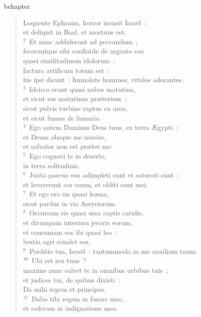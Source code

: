 bchapter\begin{verse}\vspace{-19pt}Loquente Ephraim, horror invasit Isra\"el~;\\ et deliquit in Baal, et mortuus est.\\
${}^{2}$~Et nunc addiderunt ad peccandum~;\\ feceruntque sibi conflatile de argento suo\\ quasi similitudinem idolorum~:\\ factura artificum totum est~:\\ his ipsi dicunt~: Immolate homines, vitulos adorantes.\\
${}^{3}$~Idcirco erunt quasi nubes matutina,\\ et sicut ros matutinus pr\ae teriens~;\\ sicut pulvis turbine raptus ex area,\\ et sicut fumus de fumario.\\
${}^{4}$~Ego autem Dominus Deus tuus, ex terra \AE gypti~;\\ et Deum absque me nescies,\\ et salvator non est pr\ae ter me.\\
${}^{5}$~Ego cognovi te in deserto,\\ in terra solitudinis.\\
${}^{6}$~Juxta pascua sua adimpleti sunt et saturati sunt~;\\ et levaverunt cor suum, et obliti sunt mei.\\
${}^{7}$~Et ego ero eis quasi le\ae na,\\ sicut pardus in via Assyriorum.\\
${}^{8}$~Occurram eis quasi ursa raptis catulis,\\ et dirumpam interiora jecoris eorum,\\ et consumam eos ibi quasi leo~:\\ bestia agri scindet eos.\\
${}^{9}$~Perditio tua, Isra\"el~: tantummodo in me auxilium tuum.\\
${}^{10}$~Ubi est rex tuus~?\\ maxime nunc salvet te in omnibus urbibus tuis~;\\ et judices tui, de quibus dixisti~:\\ Da mihi regem et principes.\\
${}^{11}$~Dabo tibi regem in furore meo,\\ et auferam in indignatione mea.\\

\end{verse}
